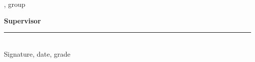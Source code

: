 \begin{titlepage}
\begin{minipage}[t]{0.42\textwidth}
\vspace{0.2cm}
\foreignlanguage{russian}{\hseAuthorName}, group \foreignlanguage{russian}{\hseGroup}
\end{minipage}
\hfill
\begin{minipage}[t]{0.5\textwidth}
\raggedright
\textbf{Supervisor}\\[0.6cm]
%
\rule{6cm}{0.4pt}\\[-0.1cm]
{\scriptsize Signature, date, grade}

\vspace{0.2cm}
\foreignlanguage{russian}{\hseSupervisorName\ifhseHasSupervisorTitle\\\hseSupervisorTitle\ifdefempty{\hseSupervisorDegree}{}{, \hseSupervisorDegree}\fi}
\end{minipage}

\vspace{1.6cm}
\begin{center}
\hseCityYear[\hseYear]
\end{center}
\end{titlepage}

\setcounter{page}{2}
\clearpage
